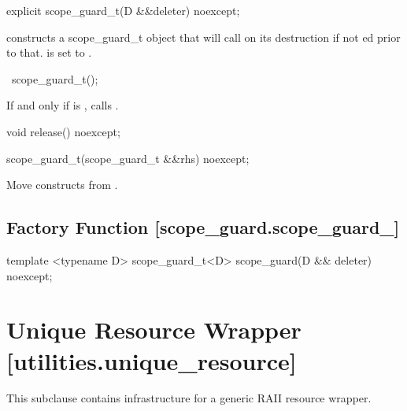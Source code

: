 \documentclass[ebook,11pt,article]{memoir}
\begin{document}
\begin{itemdecl}
explicit
scope_guard_t(D &&deleter) noexcept;
\end{itemdecl}


\pnum
\effects constructs a scope_guard_t object that will call  on its destruction if not ed prior to that.  is set to .

\begin{itemdecl}
~scope_guard_t();
\end{itemdecl}

\pnum
\effects If and only if  is , calls .


\begin{itemdecl}
void release() noexcept;
\end{itemdecl}

\pnum
\effects {}

\begin{itemdecl}
scope_guard_t(scope_guard_t  &&rhs) noexcept;
\end{itemdecl}

\pnum
\effects Move constructs  from . 

\subsection {Factory Function  [scope_guard.scope_guard_]}

\begin{itemdecl}
template <typename D>
scope_guard_t<D> scope_guard(D && deleter) noexcept;
\end{itemdecl}

\pnum
\returns {}




\section{Unique Resource Wrapper [utilities.unique_resource]}
This subclause contains infrastructure for a generic RAII resource wrapper.
\end{document}
